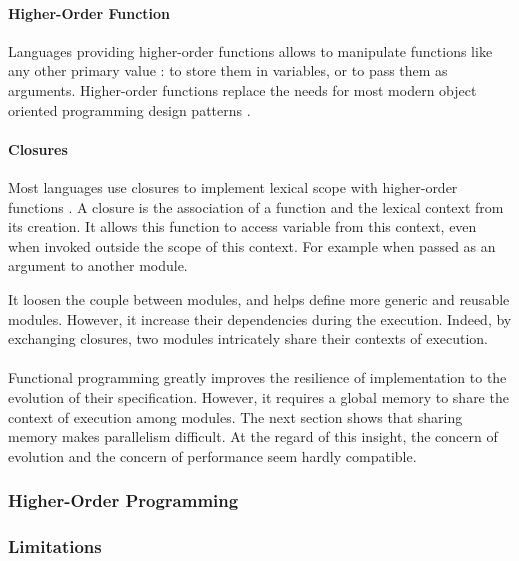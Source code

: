 \paragraph{Higher-Order Function}

Languages providing higher-order functions allows to manipulate functions like any other primary value : to store them in variables, or to pass them as arguments.
Higher-order functions replace the needs for most modern object oriented programming design patterns .

\paragraph{Closures}

Most languages use closures to implement lexical scope with higher-order functions \cite{Sussman1998}.
A closure is the association of a function and the lexical context from its creation.
It allows this function to access variable from this context, even when invoked outside the scope of this context.
For example when passed as an argument to another module.

It loosen the couple between modules, and helps define more generic and reusable modules.
However, it increase their dependencies during the execution.
Indeed, by exchanging closures, two modules intricately share their contexts of execution.

\paragraph{}

Functional programming greatly improves the resilience of implementation to the evolution of their specification.
However, it requires a global memory to share the context of execution among modules.
The next section shows that sharing memory makes parallelism difficult.
At the regard of this insight, the concern of evolution and the concern of performance seem hardly compatible.


\subsubsection{Higher-Order Programming}


\subsubsection{Limitations}

